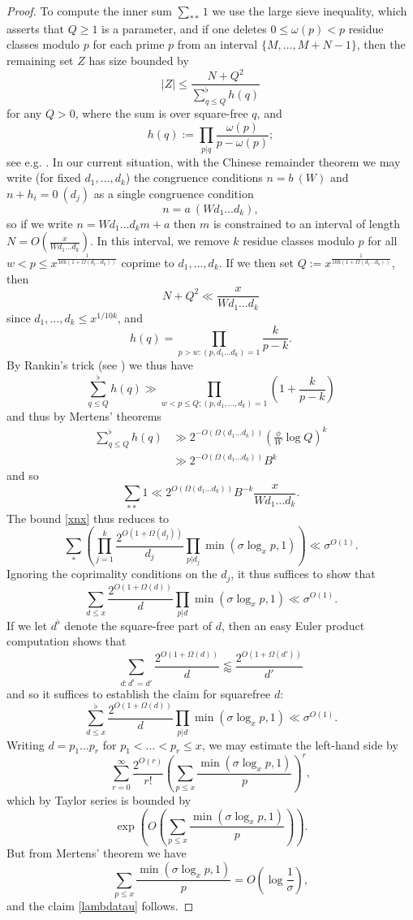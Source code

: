\begin{proof}
To compute the inner sum $\sum_{**} 1$ we use the large sieve inequality, which asserts that $Q \geq 1$ is a parameter, and if one deletes $0 \leq \omega(p) < p$ residue classes modulo $p$ for each prime $p$ from an interval $\{M,\dots,M+N-1\}$, then the remaining set $Z$ has size bounded by
$$ |Z| \leq \frac{N + Q^2}{\sum_{q \leq Q}^\flat h(q)}$$
for any $Q > 0$, where the sum is over square-free $q$, and
$$ h(q) := \prod_{p|q} \frac{\omega(p)}{p-\omega(p)};$$
see e.g. \cite[Theorem 7.14]{ik}.  In our current situation, with the Chinese remainder theorem we may write (for fixed $d_1,\dots,d_k$) the congruence conditions $n = b\ (W)$ and $n + h_i = 0\ (d_j)$ as a single congruence condition
$$ n = a\ (W d_1 \dots d_k),$$
so if we write $n = W d_1 \dots d_k m + a$ then $m$ is constrained to an interval of length $N = O( \frac{x}{W d_1 \dots d_k} )$.  In this interval, we remove $k$ residue classes modulo $p$ for all $w < p \leq x^{\frac{1}{10k(1+\Omega(d_1\dots d_k))}}$ coprime to $d_1,\dots,d_k$.  If we then set $Q := x^{\frac{1}{10k(1+\Omega(d_1\dots d_k))}}$, then
$$ N + Q^2 \ll \frac{x}{W d_1 \dots d_k} $$
since $d_1,\dots,d_k \leq x^{1/10k}$, and
$$ h(q) = \prod_{p > w: (p,d_1\dots d_k)=1} \frac{k}{p-k}.$$
By Rankin's trick (see \cite[Theorem A.3]{opera}) we thus have
$$ \sum_{q \leq Q}^\flat h(q) \gg \prod_{w < p \leq Q; (p,d_1,\dots,d_k)=1} (1 + \frac{k}{p-k}) $$
and thus by Mertens' theorems
\begin{align*}
 \sum_{q \leq Q}^\flat h(q) &\gg 2^{-O(\Omega(d_1 \dots d_k))} (\frac{\phi}{W} \log Q)^k \\
&\gg 2^{-O(\Omega(d_1 \dots d_k))} B^k
\end{align*}
and so
$$ \sum_{**} 1 \ll 2^{O(\Omega(d_1 \dots d_k))} B^{-k} \frac{x}{W d_1 \dots d_k}.$$
The bound \eqref{xnx} thus reduces to
\begin{equation}\label{xnx-2}
\sum_* (\prod_{j=1}^k \frac{2^{O(1+\Omega(d_j))}}{d_j} \prod_{p|d_j} \min( \sigma \log_x p, 1 )) \ll \sigma^{O(1)}.
\end{equation}
Ignoring the coprimality conditions on the $d_j$, it thus suffices to show that
$$ \sum_{d \leq x} \frac{2^{O(1+\Omega(d))}}{d} \prod_{p|d} \min( \sigma \log_x p, 1 ) \ll \sigma^{O(1)}.$$
If we let $d^\flat$ denote the square-free part of $d$, then an easy Euler product computation shows that
$$ \sum_{d: d^\flat = d'} \frac{2^{O(1+\Omega(d))}}{d} \lessapprox \frac{2^{O(1+\Omega(d'))}}{d'}$$
and so it suffices to establish the claim for squarefree $d$:
\begin{equation}\label{dxx}
 \sum_{d \leq x}^\flat \frac{2^{O(1+\Omega(d))}}{d} \prod_{p|d} \min( \sigma \log_x p, 1 ) \ll \sigma^{O(1)}.
\end{equation}
Writing $d = p_1 \dots p_r$ for $p_1 < \dots < p_r \leq x$, we may estimate the left-hand side by
$$ \sum_{r=0}^\infty \frac{2^{O(r)}}{r!} (\sum_{p \leq x} \frac{\min(\sigma \log_x p, 1)}{p} )^r,$$
which by Taylor series is bounded by
$$ \exp( O( \sum_{p \leq x} \frac{\min(\sigma \log_x p, 1)}{p} ) ).$$
But from Mertens' theorem we have
$$ \sum_{p \leq x} \frac{\min(\sigma \log_x p, 1)}{p} = O( \log \frac{1}{\sigma} ),$$
and the claim \eqref{lambdatau} follows.


\end{proof}
